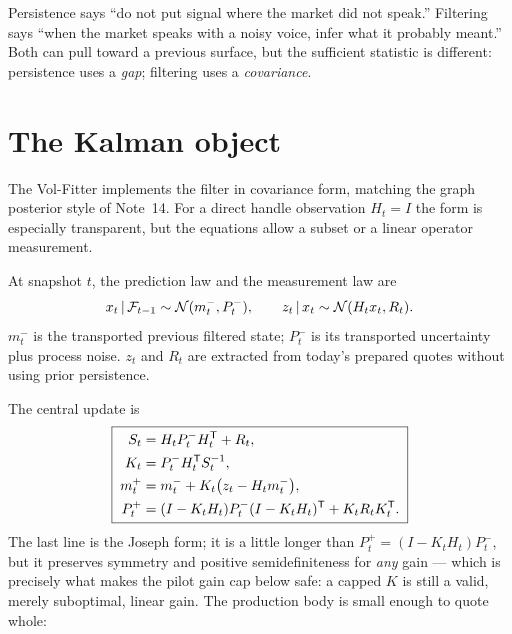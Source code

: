 \documentclass[11pt]{article}
\begin{document}
\begin{heuristic}
Persistence says ``do not put signal where the market did not speak.''
Filtering says ``when the market speaks with a noisy voice, infer what it
probably meant.'' Both can pull toward a previous surface, but the sufficient
statistic is different: persistence uses a \emph{gap}; filtering uses a
\emph{covariance}.
\end{heuristic}

\section{The Kalman object}
\label{sec:kalman}

The Vol-Fitter implements the filter in covariance form, matching the graph
posterior style of Note~14. For a direct handle observation $H_t=I$ the form
is especially transparent, but the equations allow a subset or a linear
operator measurement.

\begin{definition}
\label{def:laws}
At snapshot $t$, the prediction law and the measurement law are
\[
x_t\,|\,\mathcal F_{t-1}\sim\mathcal N(m_t^-,P_t^-),
\qquad
z_t\,|\, x_t\sim\mathcal N(H_t x_t,R_t).
\]
$m_t^-$ is the transported previous filtered state; $P_t^-$ is its transported
uncertainty plus process noise. $z_t$ and $R_t$ are extracted from today's
prepared quotes without using prior persistence.
\end{definition}

The central update is
\begin{equation}
\boxed{\;
\begin{aligned}
S_t&=H_tP_t^-H_t^{\mathsf{T}}+R_t,\\
K_t&=P_t^-H_t^{\mathsf{T}} S_t^{-1},\\
m_t^+&=m_t^-+K_t\big(z_t-H_tm_t^-\big),\\
P_t^+&=(I-K_tH_t)P_t^-(I-K_tH_t)^{\mathsf{T}}+K_tR_tK_t^{\mathsf{T}} .
\end{aligned}
\;}
\label{eq:kalman}
\end{equation}
The last line is the Joseph form; it is a little longer than
$P_t^+=(I-K_tH_t)P_t^-$, but it preserves symmetry and positive
semidefiniteness for \emph{any} gain --- which is precisely what makes the
pilot gain cap below safe: a capped $K$ is still a valid, merely suboptimal,
linear gain. The production body is small enough to quote whole:
\end{document}
